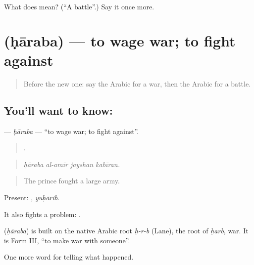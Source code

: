 \begin{tcolorbox}[breakable,colback=teal!4,colframe=teal!35!black,title={Before you move on}]
What does  mean? (\textquotedblleft{}A battle\textquotedblright{}.) Say it once more.
\end{tcolorbox}
\section[\texorpdfstring{\ar{حارب} (ḥāraba)}{حارب (ḥāraba)}]{ (ḥāraba) — to wage war; to fight against}

\label{lesson:AR-C307-haraba-war}



\begin{quote}
Before the new one: say the Arabic for a war, then the Arabic for a battle.
\end{quote}

\subsection*{You'll want to know: }
\textbf{} — \emph{ḥāraba} — \textquotedblleft{}to wage war; to fight against\textquotedblright{}.

\begin{quote}
   .
\end{quote}

\begin{quote}
\emph{ḥāraba al-amīr jayshan kabīran.}
\end{quote}

\begin{quote}
The prince fought a large army.
\end{quote}

Present: , \emph{yuḥārib}.

It also fights a problem:   .

\begin{cousinweb}
\textbf{} (\emph{ḥāraba}) is built on the native Arabic root \emph{ḥ-r-b} (Lane), the root of \emph{ḥarb}, war. It is Form III, \textquotedblleft{}to make war with someone\textquotedblright{}.
\end{cousinweb}

\begin{grammarlens}[title={What you've built}]
One more word for telling what happened.
\end{grammarlens}

